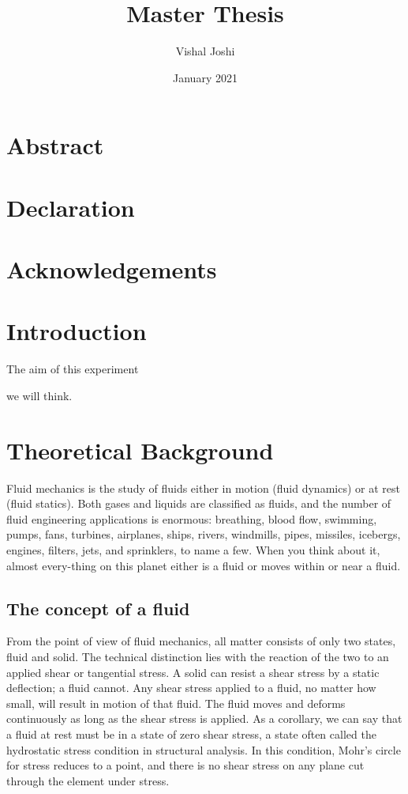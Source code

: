\documentclass[12pt,twoside]{report}
\title{Master Thesis}
\author{Vishal Joshi}
\date{January 2021}
\begin{document}
\maketitle
	
\chapter*{Abstract}
	
\chapter*{Declaration}
	
\chapter*{Acknowledgements}
	
\tableofcontents
\listoffigures
\listoftables

	
\chapter{Introduction}
The aim of this experiment \par
	
we will think.
	
\chapter{Theoretical Background}		
Fluid mechanics is the study of fluids either in motion (fluid dynamics) or at rest (fluid statics). Both gases and liquids are classified as fluids, and the number of fluid engineering applications is enormous: breathing, blood flow, swimming, pumps, fans, turbines, airplanes, ships, rivers, windmills, pipes, missiles, icebergs, engines, filters, jets, and sprinklers, to name a few.  When you think about it, almost every-thing on this planet either is a fluid or moves within or near a fluid.
	
\section{The concept of a fluid}
From the point of view of fluid mechanics, all matter consists of only two states, fluid and solid. The technical distinction lies with the reaction of the two to an applied shear or tangential stress. A solid can resist a shear stress by a static deflection; a fluid cannot. Any shear stress applied to a fluid, no matter how small, will result in motion of that fluid. The fluid moves and deforms continuously as long as the shear stress is applied. As a corollary, we can say that a fluid at rest must be in a state of zero shear stress, a state often called the hydrostatic stress condition in structural analysis. In this condition, Mohr’s circle for stress reduces to a point, and there is no shear stress on any plane cut through the	element under stress.\par
	
\end{document}
